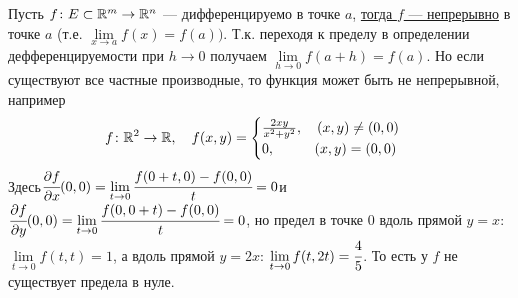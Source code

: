 \begin{zam}[https://www.youtube.com/live/4EMkUsyQQec?si=V4xWyxg3uuE68Ibm&t=10683] %
	Пусть $f \colon E \subset \mathbb R^m \to \mathbb R^n$ --- дифференцируемо в точке $a$, 
	\href{https://www.youtube.com/live/4EMkUsyQQec?si=J-Nr1tj9UMjpNZiU&t=9125}{тогда $f$ --- непрерывно}
	 в точке $a$ (т.е. $\lim\limits_{x \to a} f(x) = f(a))$. Т.к. переходя к пределу в определении дефференцируемости при $h \to 0$ получаем $\lim\limits_{h\to0} f(a + h) = f(a)$. Но если существуют все частные производные, то функция может быть не непрерывной, например
	\[f\colon \mathbb R^2 \to \mathbb R, \quad f(x, y) = \begin{cases}
		\frac{2xy}{x^2 + y^2},\quad(x, y)\ne(0,0)\\
		0,\qquad\ \ \,(x, y) = (0, 0)
	\end{cases}\]
	Здесь\quad $\cfrac{\partial f}{\partial x}(0, 0) = \lim\limits_{t \to 0}\cfrac{f(0+t, 0) - f(0, 0)}{t} = 0$\quad и\quad $\cfrac{\partial f}{\partial y}(0, 0) = \lim\limits_{t \to 0}\cfrac{f(0, 0 + t) - f(0, 0)}{t} = 0$, но предел в точке $0$ вдоль прямой $y = x$: $\lim\limits_{t \to 0}f(t,t) = 1$, а вдоль прямой $y = 2x$: $\lim\limits_{t \to 0}f(t, 2t) = \cfrac45$. То есть у $f$ не существует предела в нуле.
\end{zam} %